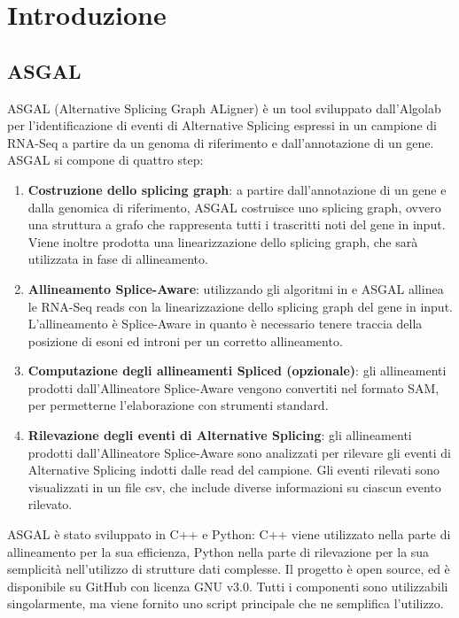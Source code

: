 \section{Introduzione}

\subsection{ASGAL}
ASGAL (Alternative Splicing Graph ALigner) \cite{ASGAL} è un tool sviluppato dall'Algolab per l'identificazione di eventi di Alternative Splicing espressi in un campione di RNA-Seq a partire da un genoma di riferimento e dall'annotazione di un gene. ASGAL si compone di quattro step:

\begin{enumerate}
	\item \textbf{Costruzione dello splicing graph}: a partire dall'annotazione di un gene e dalla genomica di riferimento, ASGAL costruisce uno splicing graph, ovvero una struttura a grafo che rappresenta tutti i trascritti noti del gene in input. Viene inoltre prodotta una linearizzazione dello splicing graph, che sarà utilizzata in fase di allineamento.
	\item \textbf{Allineamento Splice-Aware}: utilizzando gli algoritmi in \cite{MEM} e \cite{MEMAlgo} ASGAL allinea le RNA-Seq reads con la linearizzazione dello splicing graph del gene in input. L'allineamento è Splice-Aware in quanto è necessario tenere traccia della posizione di esoni ed introni per un corretto allineamento.
	\item \textbf{Computazione degli allineamenti Spliced (opzionale)}: gli allineamenti prodotti dall'Allineatore Splice-Aware vengono convertiti nel formato SAM, per permetterne l'elaborazione con strumenti standard.
	\item \textbf{Rilevazione degli eventi di Alternative Splicing}: gli allineamenti prodotti dall'Allineatore Splice-Aware sono analizzati per rilevare gli eventi di Alternative Splicing indotti dalle read del campione. Gli eventi rilevati sono visualizzati in un file csv, che include diverse informazioni su ciascun evento rilevato.
\end{enumerate}

ASGAL è stato sviluppato in C++ e Python: C++ viene utilizzato nella parte di allineamento per la sua efficienza, Python nella parte di rilevazione per la sua semplicità nell'utilizzo di strutture dati complesse. Il progetto è open source, ed è disponibile su GitHub con licenza GNU v3.0. Tutti i componenti sono utilizzabili singolarmente, ma viene fornito uno script principale che ne semplifica l'utilizzo.  

